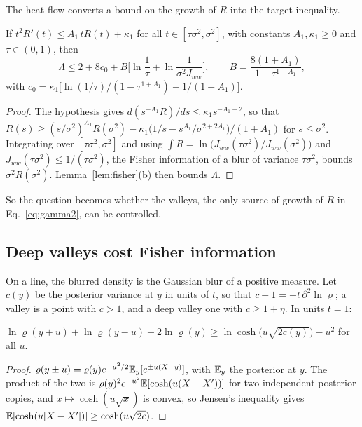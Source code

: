 The heat flow converts a bound on the growth of $R$ into the target inequality.

\begin{lemma}
\label{lem:integration}
If $t^2R'(t) \leq A_1\,tR(t) + \kappa_1$ for all $t \in [\tau\sigma^2, \sigma^2]$, with constants $A_1, \kappa_1 \geq 0$ and $\tau \in (0,1)$, then
\begin{equation}
\Lambda \leq 2 + 8c_0 + B\Big[\ln\frac1\tau + \ln\frac{1}{\sigma^2 J_{ww}}\Big], \qquad B = \frac{8(1 + A_1)}{1 - \tau^{1+A_1}},
\end{equation}
with $c_0 = \kappa_1\big[\ln(1/\tau)/(1 - \tau^{1+A_1}) - 1/(1 + A_1)\big]$.
\end{lemma}

\begin{proof}
The hypothesis gives $d(s^{-A_1}R)/ds \leq \kappa_1 s^{-A_1-2}$, so that $R(s) \geq (s/\sigma^2)^{A_1}R(\sigma^2) - \kappa_1\big(1/s - s^{A_1}/\sigma^{2+2A_1}\big)/(1+A_1)$ for $s \leq \sigma^2$. Integrating over $[\tau\sigma^2, \sigma^2]$ and using $\int R = \ln\big(J_{ww}(\tau\sigma^2)/J_{ww}(\sigma^2)\big)$ and $J_{ww}(\tau\sigma^2) \leq 1/(\tau\sigma^2)$, the Fisher information of a blur of variance $\tau\sigma^2$, bounds $\sigma^2 R(\sigma^2)$. Lemma~\ref{lem:fisher}(b) then bounds $\Lambda$.
\end{proof}

So the question becomes whether the valleys, the only source of growth of $R$ in Eq.~\eqref{eq:gamma2}, can be controlled.

\subsection{Deep valleys cost Fisher information}

On a line, the blurred density is the Gaussian blur of a positive measure. Let $c(y)$ be the posterior variance at $y$ in units of $t$, so that $c - 1 = -t\,\partial^2\ln\varrho$; a valley is a point with $c > 1$, and a deep valley one with $c \geq 1 + \eta$. In units $t = 1$:

\begin{lemma}
\label{lem:dip}
$\ln\varrho(y+u) + \ln\varrho(y-u) - 2\ln\varrho(y) \geq \ln\cosh\big(u\sqrt{2c(y)}\big) - u^2$ for all $u$.
\end{lemma}

\begin{proof}
$\varrho(y\pm u) = \varrho(y)e^{-u^2/2}\mathbb{E}_y[e^{\pm u(X - y)}]$, with $\mathbb{E}_y$ the posterior at $y$. The product of the two is $\varrho(y)^2e^{-u^2}\mathbb{E}[\cosh(u(X - X'))]$ for two independent posterior copies, and $x \mapsto \cosh(u\sqrt x)$ is convex, so Jensen's inequality gives $\mathbb{E}[\cosh(u|X - X'|)] \geq \cosh(u\sqrt{2c})$.
\end{proof}

